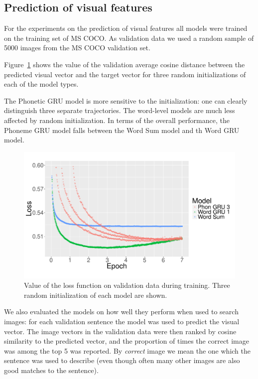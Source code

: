 \subsection{Prediction of visual features}
For the experiments on the prediction of visual features all models
were trained on the training set of MS COCO. As validation data we
used a random sample of 5000 images from the MS COCO validation set. 

Figure~\ref{fig:loss} shows the value of the validation average cosine distance
between the predicted visual vector and the target vector for three
random initializations of each of the model types. 

The Phonetic GRU model is more sensitive to the initialization: one
can clearly distinguish three separate trajectories. The word-level models
are much less affected by random initialization. In terms of the
overall performance, the {\sc Phoneme GRU} model falls between the
{\sc Word Sum} model and th {\sc Word GRU} model.

\begin{figure}
  \centering
  \includegraphics[scale=0.3]{loss-zoom.pdf}
  \caption{Value of the loss function on validation data during
    training. Three random initialization of each model are shown.}
  \label{fig:loss}
\end{figure}

We also evaluated the models on how well they perform when used to
search images: for each validation sentence the model was used to predict the
visual vector. The image vectors in the validation data were then
ranked by cosine similarity to the predicted vector, and the
proportion of times the correct image was among the top 5 was
reported. By {\it correct} image we mean the one which the sentence
was used to describe (even though often many other images are also
good matches to the sentence). 

